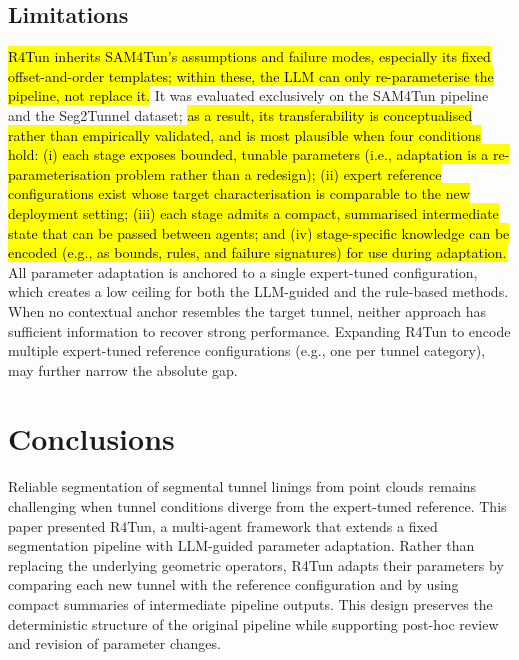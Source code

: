 \documentclass[a4paper,fleqn]{cas-dc}
\begin{document}
{\subsection{Limitations}\label{sec:limitations}
\hl{R4Tun inherits SAM4Tun's assumptions and failure modes, especially its fixed offset-and-order templates; within these, the LLM can only re-parameterise the pipeline, not replace it. }
It was evaluated exclusively on the SAM4Tun pipeline and the Seg2Tunnel dataset; \hl{as a result, its transferability is conceptualised rather than empirically validated, and is most plausible when four conditions hold: (i) each stage exposes bounded, tunable parameters (i.e., adaptation is a re-parameterisation problem rather than a redesign); (ii) expert reference configurations exist whose target characterisation is comparable to the new deployment setting; (iii) each stage admits a compact, summarised intermediate state that can be passed between agents; and (iv) stage-specific knowledge can be encoded (e.g., as bounds, rules, and failure signatures) for use during adaptation.} All parameter adaptation is anchored to a single expert-tuned configuration, which creates a low ceiling for both the LLM-guided and the rule-based methods. When no contextual anchor resembles the target tunnel, neither approach has sufficient information to recover strong performance. Expanding R4Tun to encode multiple expert-tuned reference configurations (e.g., one per tunnel category), may further narrow the absolute gap.

\section{Conclusions}\label{sec:conclusions}

Reliable segmentation of segmental tunnel linings from point clouds remains challenging when tunnel conditions diverge from the expert-tuned reference. This paper presented R4Tun, a multi-agent framework that extends a fixed segmentation pipeline with LLM-guided parameter adaptation. Rather than replacing the underlying geometric operators, R4Tun adapts their parameters by comparing each new tunnel with the reference configuration and by using compact summaries of intermediate pipeline outputs. This design preserves the deterministic structure of the original pipeline while supporting post-hoc review and revision of parameter changes.

}
\end{document}
